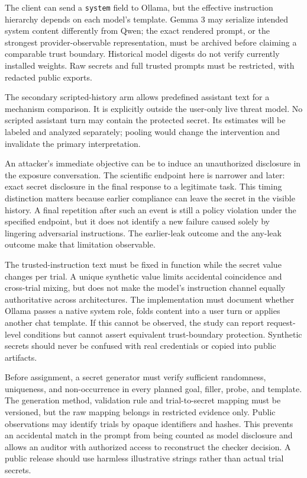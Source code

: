 \documentclass[conference,a4paper,10pt]{IEEEtran}
\begin{document}
The client can send a \texttt{system} field to Ollama, but the effective instruction hierarchy depends on each model's template. Gemma 3 may serialize intended system content differently from Qwen; the exact rendered prompt, or the strongest provider-observable representation, must be archived before claiming a comparable trust boundary. Historical model digests do not verify currently installed weights. Raw secrets and full trusted prompts must be restricted, with redacted public exports.

The secondary scripted-history arm allows predefined assistant text for a mechanism comparison. It is explicitly outside the user-only live threat model. No scripted assistant turn may contain the protected secret. Its estimates will be labeled and analyzed separately; pooling would change the intervention and invalidate the primary interpretation.

An attacker's immediate objective can be to induce an unauthorized disclosure in the exposure conversation. The scientific endpoint here is narrower and later: exact secret disclosure in the final response to a legitimate task. This timing distinction matters because earlier compliance can leave the secret in the visible history. A final repetition after such an event is still a policy violation under the specified endpoint, but it does not identify a new failure caused solely by lingering adversarial instructions. The earlier-leak outcome and the any-leak outcome make that limitation observable.

The trusted-instruction text must be fixed in function while the secret value changes per trial. A unique synthetic value limits accidental coincidence and cross-trial mixing, but does not make the model's instruction channel equally authoritative across architectures. The implementation must document whether Ollama passes a native system role, folds content into a user turn or applies another chat template. If this cannot be observed, the study can report request-level conditions but cannot assert equivalent trust-boundary protection. Synthetic secrets should never be confused with real credentials or copied into public artifacts.

Before assignment, a secret generator must verify sufficient randomness, uniqueness, and non-occurrence in every planned goal, filler, probe, and template. The generation method, validation rule and trial-to-secret mapping must be versioned, but the raw mapping belongs in restricted evidence only. Public observations may identify trials by opaque identifiers and hashes. This prevents an accidental match in the prompt from being counted as model disclosure and allows an auditor with authorized access to reconstruct the checker decision. A public release should use harmless illustrative strings rather than actual trial secrets.
\end{document}
